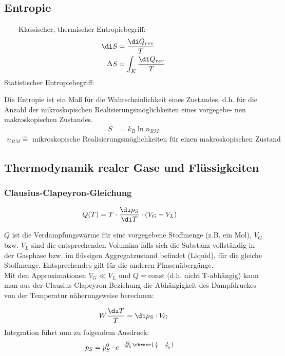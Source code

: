 \documentclass[11pt,letterpaper]{article}
\begin{document}
{{{}

\subsection{Entropie}{
    \ \ \ \ Klassischer, thermischer Entropiebegriff:
    \begin{align*}
        \di S &= \frac{\di Q_{rev}}{T} \\
        \Delta S &= \int_K \frac{\di Q_{rev}}{T} 
    \end{align*}
    Statistischer Entropiebegriff:

    Die Entropie ist ein Maß für die Wahrscheinlichkeit eines Zustandes, d.h. für
    die Anzahl der mikroskopischen Realisierungsmöglichkeiten eines vorgegebe-
    nen makroskopischen Zustandes.
    \begin{align*}
        S &= k_B \ln n_{RM}
    \end{align*}
    \begin{align*}
        n_{RM} \hat{=} \text{ mikroskopische Realisierungsmöglichkeiten für einen makroskopischen Zustand}
    \end{align*}
}

\subsection{Thermodynamik realer Gase und Flüssigkeiten}
{
    \subsubsection{Clausius-Clapeyron-Gleichung}
    {
        \begin{align*}
            Q(T) &= T\cdot \frac{\di p_S}{\di T} \cdot (V_G - V_L)
        \end{align*}

        $Q$ ist die Verdampfungswärme für eine vorgegebene Stoffmenge (z.B. ein Mol), $V_G$
        bzw. $V_L$ sind die entsprechenden Volumina falls sich die Substanz vollständig in
        der Gasphase bzw. im flüssigen Aggregatzustand befindet (Liquid), für die gleiche
        Stoffmenge. Entsprechendes gilt für die anderen Phasenübergänge.\\

        Mit den Approximationen $V_G \ll V_L$ und $Q = \mathrm{const}$ (d.h. nicht T-abhängig) kann
        man aus der Clausius-Clapeyron-Beziehung die Abhängigkeit des Dampfdruckes
        von der Temperatur näherungsweise berechnen:

        \begin{align*}
            W \frac{\di T}{T} = \di p_S \cdot V_G
        \end{align*}
        Integration führt nun zu folgendem Ausdruck: 
        \begin{align*}
            p_S &= p_S^0 \cdot e ^{-\frac{Q}{Nk}\cbrace{\frac{1}{T}-\frac{1}{T_0}}}
        \end{align*}
    }
}}}
\end{document}
